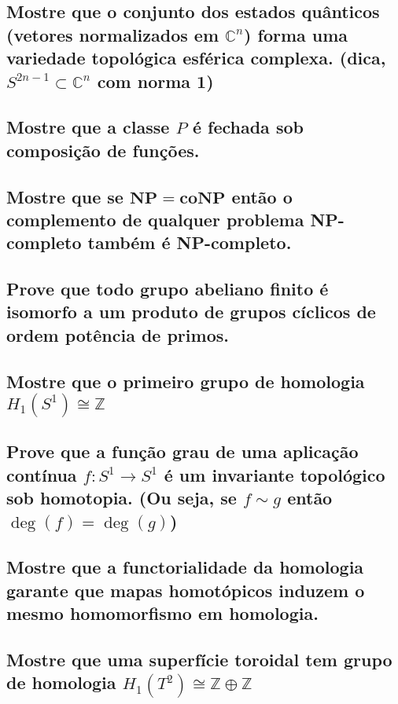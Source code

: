 \documentclass{article}
\begin{document}
\subsection{Mostre que o conjunto dos estados quânticos (vetores normalizados em $\mathbb{C}^n$) forma uma variedade topológica esférica complexa. (dica, $S^{2n-1} \subset \mathbb{C}^n$ com norma 1)}

\subsection{Mostre que a classe $P$ é fechada sob composição de funções.}

\subsection{Mostre que se $\mathbf{NP} = \mathbf{coNP}$ então o complemento de qualquer problema NP-completo também é NP-completo.}

\subsection{Prove que todo grupo abeliano finito é isomorfo a um produto de grupos cíclicos de ordem potência de primos.}

\subsection{Mostre que o primeiro grupo de homologia $H_1(S^1) \cong \mathbb{Z}$}

\subsection{Prove que a função grau de uma aplicação contínua $f: S^1 \to S^1$ é um invariante topológico sob homotopia. (Ou seja, se $f \sim g$ então $\deg(f) = \deg(g)$)}

\subsection{Mostre que a functorialidade da homologia garante que mapas homotópicos induzem o mesmo homomorfismo em homologia.}

\subsection{Mostre que uma superfície toroidal tem grupo de homologia $H_1(T^2) \cong \mathbb{Z} \oplus \mathbb{Z}$}
\end{document}
